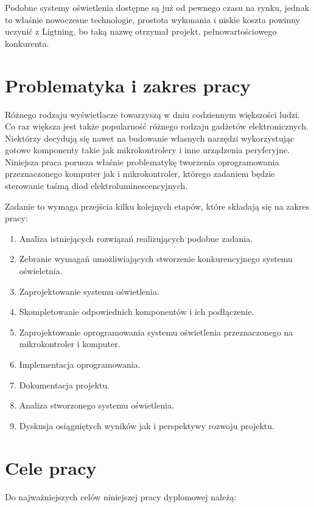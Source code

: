 \documentclass[12pt]{report}
\begin{document}
Podobne systemy oświetlenia dostępne są już od pewnego czasu na rynku, jednak to właśnie nowoczesne technologie, prostota wykonania i niskie koszta powinny uczynić z Ligtning, bo taką nazwę otrzymał projekt, pełnowartościowego konkurenta.

\section{Problematyka i zakres pracy}

Różnego rodzaju wyświetlacze towarzyszą w dniu codziennym większości ludzi. Co raz większa jest także popularność różnego rodzaju gadżetów elektronicznych. Niektórzy decydują się nawet na budowanie własnych narzędzi wykorzystując gotowe komponenty takie jak mikrokontrolery i inne urządzenia peryferyjne. Niniejsza praca porusza właśnie problematykę tworzenia oprogramowania przeznaczonego komputer jak i mikrokontroler, którego zadaniem będzie sterowanie taśmą diod elektroluminescencyjnych.

Zadanie to wymaga przejścia kilku kolejnych etapów, które składają się na zakres pracy:

\begin{enumerate}
	\item Analiza istniejących rozwiązań realizujących podobne zadania.
	\item Zebranie wymagań umożliwiających stworzenie konkurencyjnego systemu oświeletnia.
	\item Zaprojektowanie systemu oświetlenia.
	\item Skompletowanie odpowiednich komponentów i ich podłączenie.
	\item Zaprojektowanie oprogramowania systemu oświetlenia przeznaczonego na mikrokontroler i komputer.
	\item Implementacja oprogramowania.
	\item Dokumentacja projektu.
	\item Analiza stworzonego systemu oświetlenia.
	\item Dyskusja osiągniętych wyników jak i perspektywy rozwoju projektu.
\end{enumerate}

\section{Cele pracy}

Do najważniejszych celów niniejszej pracy dyplomowej należą:
\end{document}
